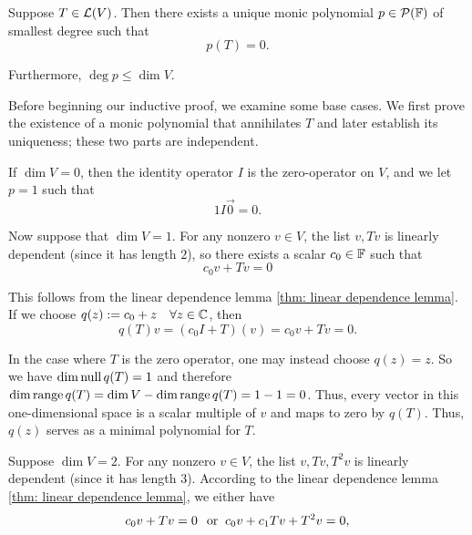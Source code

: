 \begin{thm}
  \label{thm: unique monic polynomial of smallest degree}
  Suppose $T\in \mathcal{L}(V)$. Then there exists a unique monic polynomial $p\in \mathcal{P}(\mathbb{F})$ of smallest degree such that
  \begin{equation}
    p(T)=0.
  \end{equation}

  Furthermore, $\deg p \leq \dim V$.
\end{thm}
\begin{prf}
  Before beginning our inductive proof, we examine some base cases. We first prove the existence of a monic polynomial that annihilates $T$ and later establish its uniqueness; these two parts are independent.


   If $\dim V=0$, then the identity operator $I$ is the zero-operator on $V$, and we let $p=1$ such that
  \begin{equation}
      1I\vec0=0.
  \end{equation}

   Now suppose that $\dim V=1$. For any nonzero $v \in V$, the list $v, Tv$ is linearly dependent (since it has length $2$), so there exists a scalar $c_0 \in \mathbb{F}$ such that
  \begin{equation}
    c_0v + Tv = 0
  \end{equation}

  This follows from the linear dependence lemma \ref{thm: linear dependence lemma}. If we choose $q(z) := c_0+z \quad \forall z \in \mathbb{C}$, then
  \begin{equation}
    q(T)v=(c_0 I+T)(v)=c_0v+Tv=0.
  \end{equation}

  In the case where $T$ is the zero operator, one may instead choose $q(z) = z$. So we have $\dim \operatorname{null} q(T) = 1$ and therefore $\dim \operatorname{range} q(T) = \dim V - \dim \operatorname{range} q(T) = 1-1= 0$. Thus, every vector in this one-dimensional space is a scalar multiple of $v$ and maps to zero by $q(T)$. Thus, $q(z)$ serves as a minimal polynomial for $T$.

   Suppose $\dim V=2$. For any nonzero $v \in V$, the list $v, Tv, T^2v$ is linearly dependent (since it has length $3$). According to the linear dependence lemma \ref{thm: linear dependence lemma}, we either have
  \begin{equation}
     c_0v + Tv = 0 \;\;\, \text{or}\;\;
     c_0v + c_1Tv + T^2v = 0,
  \end{equation}


\end{prf}
